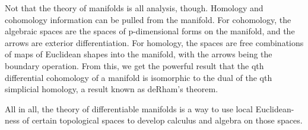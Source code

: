 \par
Not that the theory of manifolds is all analysis, though.
Homology and cohomology information can be pulled from the
manifold. For cohomology, the algebraic spaces are the spaces of p-dimensional
forms on the manifold, and the arrows are exterior differentiation. For
homology, the spaces are free combinations of maps of Euclidean shapes into the
manifold, with the arrows being the boundary operation. From this, we get the
powerful result that the qth differential cohomology of a manifold is isomorphic 
to the dual of the qth simplicial homology, a result known as deRham's theorem.
\par
All in all, the theory of differentiable manifolds is a way to use local
Euclidean-ness of certain topological spaces to develop calculus and algebra on
those spaces.
